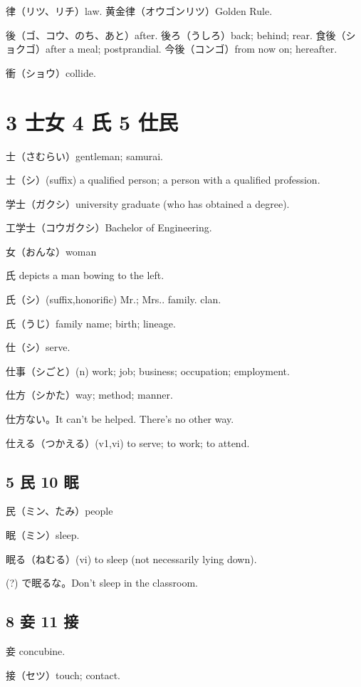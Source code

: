 律（リツ、リチ）law.
黄金律（オウゴンリツ）Golden Rule.

後（ゴ、コウ、のち、あと）after.
後ろ（うしろ）back; behind; rear.
食後（ショクゴ）after a meal; postprandial.
今後（コンゴ）from now on; hereafter.

衝（ショウ）collide.

\section{3 士女 4 氏 5 仕民}

士（さむらい）gentleman; samurai.

士（シ）(suffix)
a qualified person;
a person with a qualified profession.

学士（ガクシ）university graduate (who has obtained a degree).

工学士（コウガクシ）Bachelor of Engineering.

女（おんな）woman

氏 depicts a man bowing to the left.

氏（シ）(suffix,honorific) Mr.; Mrs.. family. clan.

氏（うじ）family name; birth; lineage.

仕（シ）serve.

仕事（シごと）(n) work; job; business; occupation; employment.

仕方（シかた）way; method; manner.

仕方ない。It can't be helped. There's no other way.

仕える（つかえる）(v1,vi) to serve; to work; to attend.

\subsection{5 民 10 眠}

民（ミン、たみ）people

眠（ミン）sleep.

眠る（ねむる）(vi) to sleep (not necessarily lying down).

(?) で眠るな。Don't sleep in the classroom.

\subsection{8 妾 11 接}

妾 concubine.

接（セツ）touch; contact.

